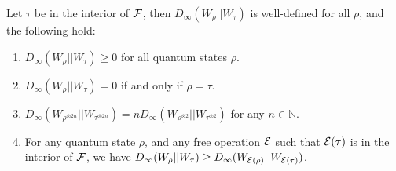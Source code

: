 \documentclass[pra,
aps,
twocolumn,
superscriptaddress,
groupedaddress,
nofootinbib,
reprint
]{revtex4-1}
\begin{document}
\begingroup
\def\thetheorem{\ref{thm:Dinfty}}
\begin{theorem}
	Let $\tau$ be in the interior of ${\mathcal F}$, then $D_\infty(W_\rho || W_\tau)$ is well-defined for all $\rho$, and the following hold:
\begin{enumerate}
\item $D_\infty(W_\rho || W_\tau) \geq 0$ for all quantum states $\rho$.
\item  $D_\infty(W_\rho || W_\tau) = 0$ if and only if $\rho =\tau$.
\item $D_\infty(W_{\rho^{\otimes 2n}} || W_{\tau^{\otimes 2n}}) = n D_\infty(W_{\rho^{\otimes 2}} || W_{\tau^{\otimes 2}})$ for any $n \in \mathbb{N}$.
\item For any quantum state $\rho$, and any free operation ${\mathcal E}$ such that ${\mathcal E}(\tau)$ is in the interior of ${\mathcal F}$, we have $D_\infty (W_\rho || W_\tau) \geq D_\infty (W_{{\mathcal E}(\rho)} || W_{{\mathcal E}(\tau)})$.
\end{enumerate}
\end{theorem}
\addtocounter{theorem}{-1}
\endgroup
\end{document}
